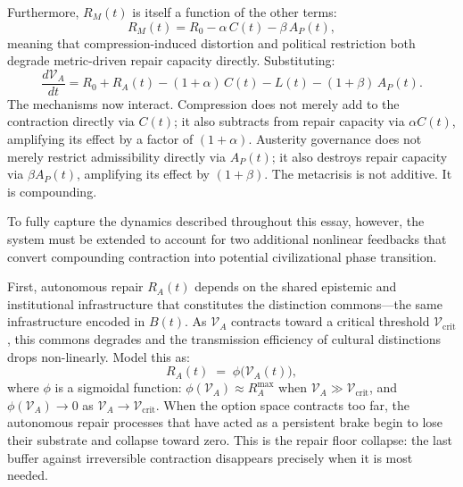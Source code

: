 \documentclass[11pt, letterpaper]{article}
\begin{document}
Furthermore, $R_M(t)$ is itself a function of the other terms:
\[
  R_M(t) = R_0 - \alpha\, C(t) - \beta\, A_P(t),
\]
meaning that compression-induced distortion and political restriction both degrade metric-driven repair capacity directly. Substituting:
\[
  \frac{d\mathcal{V}_A}{dt} = R_0 + R_A(t) - (1+\alpha)\,C(t) - L(t) - (1+\beta)\,A_P(t).
\]
The mechanisms now interact. Compression does not merely add to the contraction directly via $C(t)$; it also subtracts from repair capacity via $\alpha C(t)$, amplifying its effect by a factor of $(1+\alpha)$. Austerity governance does not merely restrict admissibility directly via $A_P(t)$; it also destroys repair capacity via $\beta A_P(t)$, amplifying its effect by $(1+\beta)$. The metacrisis is not additive. It is compounding.

To fully capture the dynamics described throughout this essay, however, the system must be extended to account for two additional nonlinear feedbacks that convert compounding contraction into potential civilizational phase transition.

First, autonomous repair $R_A(t)$ depends on the shared epistemic and institutional infrastructure that constitutes the distinction commons---the same infrastructure encoded in $B(t)$. As $\mathcal{V}_A$ contracts toward a critical threshold $\mathcal{V}_{\text{crit}}$, this commons degrades and the transmission efficiency of cultural distinctions drops non-linearly. Model this as:
\[
  R_A(t) \;=\; \phi\!\bigl(\mathcal{V}_A(t)\bigr),
\]
where $\phi$ is a sigmoidal function: $\phi(\mathcal{V}_A) \approx R_A^{\max}$ when $\mathcal{V}_A \gg \mathcal{V}_{\text{crit}}$, and $\phi(\mathcal{V}_A) \to 0$ as $\mathcal{V}_A \to \mathcal{V}_{\text{crit}}$. When the option space contracts too far, the autonomous repair processes that have acted as a persistent brake begin to lose their substrate and collapse toward zero. This is the repair floor collapse: the last buffer against irreversible contraction disappears precisely when it is most needed.
\end{document}
